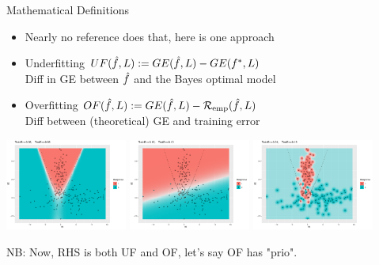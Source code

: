 \begin{vbframe}{Mathematical Definitions}

\begin{itemize}
\item Nearly no reference does that, here is one approach
\item Underfitting
    $UF(\hat{f}, L) : = GE(\hat{f}, L) - GE(f^{\ast}, L)$\\
    Diff in GE between $\hat{f}$ and the Bayes optimal model
\item Overfitting
    $OF(\hat{f}, L) : = GE(\hat{f}, L) - \mathcal{R}_{\text{emp}}(\hat{f}, L)$\\
    Diff between (theoretical) GE and training error
\end{itemize}

\lz

\begin{center}
\includegraphics[width=0.3\textwidth,trim={0.8cm 0.6cm 3cm 0},clip]{figure/eval_ofit_1a}
\includegraphics[width=0.3\textwidth,trim={0.8cm 0.6cm 3cm 0},clip]{figure/eval_ofit_1u}
\includegraphics[width=0.3\textwidth,trim={0.8cm 0.6cm 3cm 0},clip]{figure/eval_ofit_1o}
\end{center}
NB: Now, RHS is both UF and OF, let's say OF has "prio". 
\end{vbframe}


